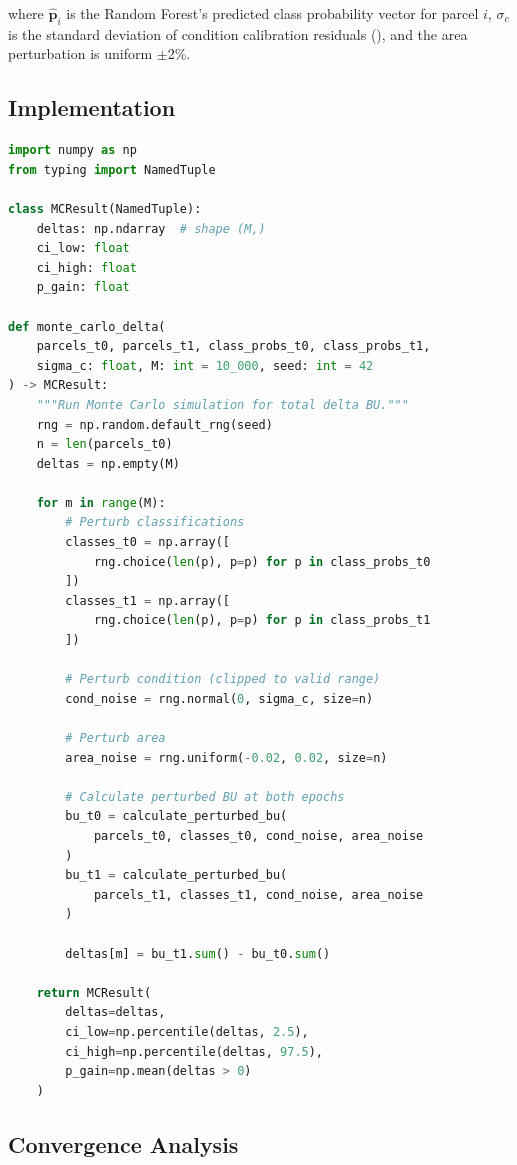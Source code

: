 \noindent where $\hat{\mathbf{p}}_i$ is the Random Forest's predicted class probability vector for parcel $i$, $\sigma_c$ is the standard deviation of condition calibration residuals (), and the area perturbation is uniform $\pm$2\%.

\subsection{Implementation}

\begin{lstlisting}[language=Python,caption={Monte Carlo delta simulation.},label={lst:mc-sim}]
import numpy as np
from typing import NamedTuple

class MCResult(NamedTuple):
    deltas: np.ndarray  # shape (M,)
    ci_low: float
    ci_high: float
    p_gain: float

def monte_carlo_delta(
    parcels_t0, parcels_t1, class_probs_t0, class_probs_t1,
    sigma_c: float, M: int = 10_000, seed: int = 42
) -> MCResult:
    """Run Monte Carlo simulation for total delta BU."""
    rng = np.random.default_rng(seed)
    n = len(parcels_t0)
    deltas = np.empty(M)

    for m in range(M):
        # Perturb classifications
        classes_t0 = np.array([
            rng.choice(len(p), p=p) for p in class_probs_t0
        ])
        classes_t1 = np.array([
            rng.choice(len(p), p=p) for p in class_probs_t1
        ])

        # Perturb condition (clipped to valid range)
        cond_noise = rng.normal(0, sigma_c, size=n)

        # Perturb area
        area_noise = rng.uniform(-0.02, 0.02, size=n)

        # Calculate perturbed BU at both epochs
        bu_t0 = calculate_perturbed_bu(
            parcels_t0, classes_t0, cond_noise, area_noise
        )
        bu_t1 = calculate_perturbed_bu(
            parcels_t1, classes_t1, cond_noise, area_noise
        )

        deltas[m] = bu_t1.sum() - bu_t0.sum()

    return MCResult(
        deltas=deltas,
        ci_low=np.percentile(deltas, 2.5),
        ci_high=np.percentile(deltas, 97.5),
        p_gain=np.mean(deltas > 0)
    )
\end{lstlisting}

\subsection{Convergence Analysis}

